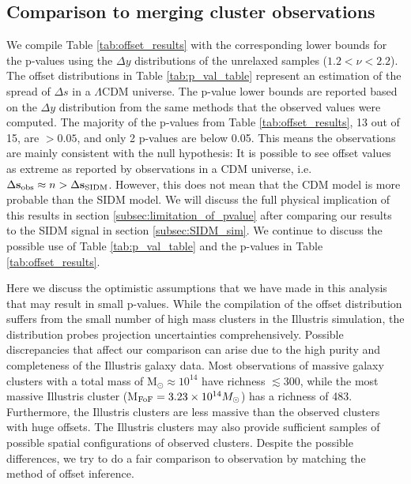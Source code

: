   
\subsection{Comparison to merging cluster observations}

We compile Table \ref{tab:offset_results} with the corresponding lower bounds
for the p-values using
the $\Delta y$ distributions of the unrelaxed samples ($1.2 < \nu < 2.2$). 
The offset distributions in Table \ref{tab:p_val_table}
represent an estimation of the spread of $\Delta s$ in a $\Lambda$CDM universe.
The p-value lower bounds are reported based on the $\Delta y$ distribution 
from the same methods that the observed values were computed. 
The majority of the p-values from Table \ref{tab:offset_results}, 13 out of 15, are
$ > 0.05$, and only 2 p-values are below 0.05. 
This means the observations are mainly consistent with the null hypothesis: 
It is possible to see offset values as extreme as reported by observations
in a CDM universe, i.e. $\Delta {\bf s}_{\rm obs} \approx n > \Delta {\bf s}_{{\rm SIDM}}$. 
However, this does not mean that the CDM model is more probable than the SIDM model. 
We will discuss the full physical implication of this results in section  
\ref{subsec:limitation_of_pvalue} after comparing our results to the SIDM signal 
in section \ref{subsec:SIDM_sim}. 
We continue to discuss the possible use of Table \ref{tab:p_val_table} and
the p-values in Table \ref{tab:offset_results}.

Here we discuss the optimistic assumptions that we have made in this analysis  
that may result in small p-values.
While the compilation of the offset distribution suffers 
from the small number of high mass clusters in the Illustris simulation, 
the distribution probes projection uncertainties comprehensively. 
Possible discrepancies that affect our comparison can arise
due to the high purity and completeness of the Illustris galaxy data.
Most observations of massive galaxy clusters with a total mass of M$_\odot
\approx 10^{14}$ have richness $\lesssim 300$, while the most massive Illustris
cluster (M$_{\rm FoF} = 3.23 \times 10^{14} M_\odot$) has a richness of 483.
Furthermore, the Illustris clusters are less massive than the observed clusters
with huge offsets. The Illustris clusters may also provide sufficient samples
of possible spatial configurations of observed clusters.
Despite the possible differences, we try to do a
fair comparison to observation by matching the method of offset inference. 

